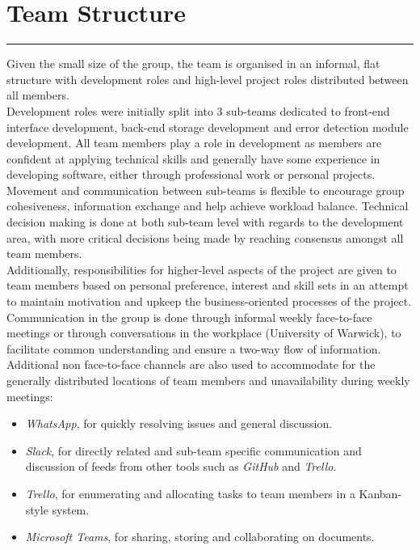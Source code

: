 \documentclass{article}
\begin{document}
\section*{Team Structure}
\hrule
\vspace{9pt}
Given the small size of the group, the team is organised in an informal, flat structure with development roles and high-level project roles distributed between all members. 
\\
Development roles were initially split into 3 sub-teams dedicated to front-end interface development, back-end storage development and error detection module development. All team members play a role in development as members are confident at applying technical skills and generally have some experience in developing software, either through professional work or personal projects. Movement and communication between sub-teams is flexible to encourage group cohesiveness, information exchange and help achieve workload balance. Technical decision making is done at both sub-team level with regards to the development area, with more critical decisions being made by reaching consensus amongst all team members.
\\
Additionally, responsibilities for higher-level aspects of the project are given to team members based on personal preference, interest and skill sets in an attempt to maintain motivation and upkeep the business-oriented processes of the project. 
\\
Communication in the group is done through informal weekly face-to-face meetings or through conversations in the workplace (University of Warwick), to facilitate common understanding and ensure a two-way flow of information. Additional non face-to-face channels are also used to accommodate for the generally distributed locations of team members and unavailability during weekly meetings:
\begin{itemize}
    \item \textit{WhatsApp}, for quickly resolving issues and general discussion. 
    \item \textit{Slack}, for directly related and sub-team specific communication and discussion of feeds from other tools such as \textit{GitHub} and \textit{Trello}. 
    \item \textit{Trello}, for enumerating and allocating tasks to team members in a Kanban-style system. 
    \item \textit{Microsoft Teams}, for sharing, storing and collaborating on documents. 
\end{itemize}
\end{document}
